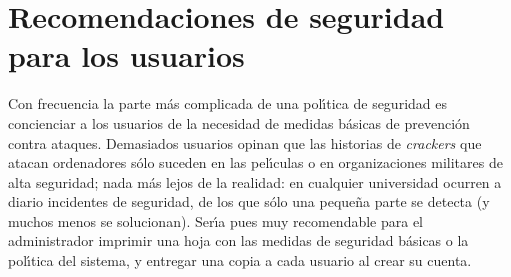 \section{Recomendaciones de seguridad para los usuarios}
Con frecuencia la parte m\'as complicada de una pol\'{\i}tica de seguridad es
concienciar a los usuarios de la necesidad de medidas b\'asicas de prevenci\'on
contra ataques. Demasiados usuarios opinan que las historias de {\it crackers}
que atacan ordenadores s\'olo suceden en las pel\'{\i}culas o en organizaciones
militares de alta seguridad; nada m\'as lejos de la realidad: en cualquier
universidad ocurren a diario incidentes de seguridad, de los que s\'olo una
peque\~na parte se detecta (y muchos menos se solucionan). Ser\'{\i}a pues
muy recomendable para el administrador imprimir una hoja con las medidas de 
seguridad b\'asicas o la pol\'{\i}tica del sistema, y entregar una copia a 
cada usuario al crear su cuenta.
